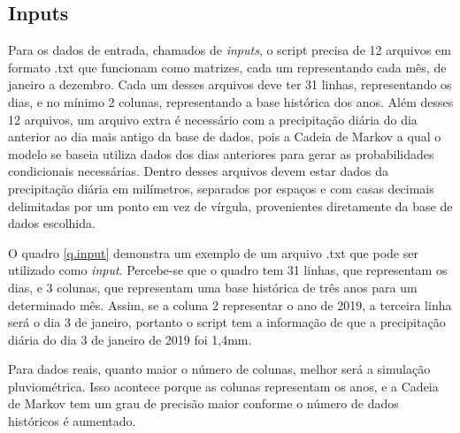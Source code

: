 \subsection{Inputs}
\label{ss.inputs}
Para os dados de entrada, chamados de \emph{inputs}, o script precisa de 12 arquivos em formato .txt que funcionam como matrizes, cada um representando cada mês, de janeiro a dezembro. Cada um desses arquivos deve ter 31 linhas, representando os dias, e no mínimo 2 colunas, representando a base histórica dos anos. Além desses 12 arquivos, um arquivo extra é necessário com a precipitação diária do dia anterior ao dia mais antigo da base de dados, pois a Cadeia de Markov a qual o modelo se baseia utiliza dados dos dias anteriores para gerar as probabilidades condicionais necessárias. Dentro desses arquivos devem estar dados da precipitação diária em milímetros, separados por espaços e com casas decimais delimitadas por um ponto em vez de vírgula, provenientes diretamente da base de dados escolhida. 

O quadro \ref{q.input} demonstra um exemplo de um arquivo .txt que pode ser utilizado como \emph{input}. Percebe-se que o quadro tem 31 linhas, que representam os dias, e 3 colunas, que representam uma base histórica de três anos para um determinado mês. Assim, se a coluna 2 representar o ano de 2019, a terceira linha será o dia 3 de janeiro, portanto o script tem a informação de que a precipitação diária do dia 3 de janeiro de 2019 foi 1,4mm.

Para dados reais, quanto maior o número de colunas, melhor será a simulação pluviométrica. Isso acontece porque as colunas representam os anos, e a Cadeia de Markov tem um grau de precisão maior conforme o número de dados históricos é aumentado.

